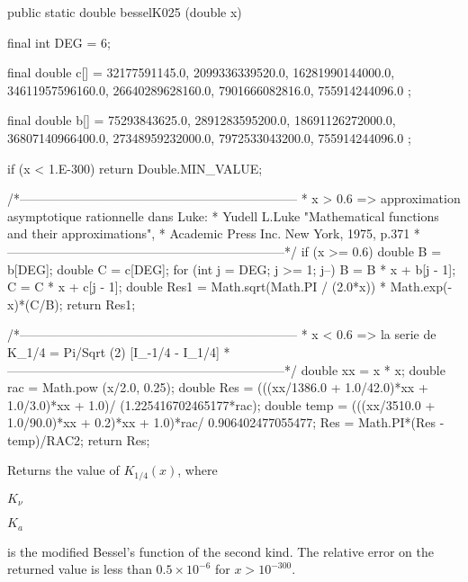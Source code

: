\begin{code}

   public static double besselK025 (double x)\begin{hide} {
      final int DEG = 6;

      final double c[] = {
         32177591145.0,
         2099336339520.0,
         16281990144000.0,
         34611957596160.0,
         26640289628160.0,
         7901666082816.0,
         755914244096.0
      };

      final double b[] = {
         75293843625.0,
         2891283595200.0,
         18691126272000.0,
         36807140966400.0,
         27348959232000.0,
         7972533043200.0,
         755914244096.0
      };

      if (x < 1.E-300)
         return Double.MIN_VALUE;

      /*------------------------------------------------------------------
       * x > 0.6 => approximation asymptotique rationnelle dans Luke:
       * Yudell L.Luke "Mathematical functions and their approximations",
       * Academic Press Inc. New York, 1975, p.371
       *------------------------------------------------------------------*/
      if (x >= 0.6) {
         double B = b[DEG];
         double C = c[DEG];
         for (int j = DEG; j >= 1; j--) {
            B = B * x + b[j - 1];
            C = C * x + c[j - 1];
         }
         double Res1 = Math.sqrt(Math.PI / (2.0*x)) * Math.exp(-x)*(C/B);
         return Res1;
      }

      /*------------------------------------------------------------------
       * x < 0.6 => la serie de K_{1/4} = Pi/Sqrt (2) [I_{-1/4} - I_{1/4}]
       *------------------------------------------------------------------*/
      double xx = x * x;
      double rac = Math.pow (x/2.0, 0.25);
      double Res = (((xx/1386.0 + 1.0/42.0)*xx + 1.0/3.0)*xx + 1.0)/
              (1.225416702465177*rac);
      double temp = (((xx/3510.0 + 1.0/90.0)*xx + 0.2)*xx + 1.0)*rac/
                     0.906402477055477;
      Res = Math.PI*(Res - temp)/RAC2;
      return Res;
   }\end{hide}
\end{code}
  \begin{tabb} Returns the value of $K_{1/4}(x)$, where \begin{latexonly}
 $K_{\nu}$\end{latexonly}\begin{htmlonly}$K_a$ \end{htmlonly} is the modified
  Bessel's function of the second kind.
  The relative error on the returned value is less than
  $0.5\times 10^{-6}$ for $x > 10^{-300}$.
 \end{tabb}
